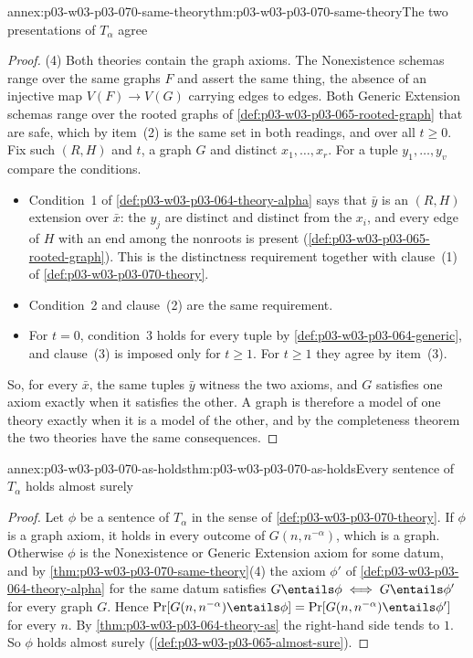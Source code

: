 \begin{annexitem}{annex:p03-w03-p03-070-same-theory}{thm:p03-w03-p03-070-same-theory}{The two presentations of \(T_\alpha\) agree}
\begin{proof}
(4) Both theories contain the graph axioms.  The Nonexistence schemas range
over the same graphs \(F\) and assert the same thing, the absence of an
injective map \(V(F)\to V(G)\) carrying edges to edges.  Both Generic
Extension schemas range over the rooted graphs of
\cref{def:p03-w03-p03-065-rooted-graph} that are safe, which by item~(2) is
the same set in both readings, and over all \(t\geq0\).  Fix such
\((R,H)\) and \(t\), a graph \(G\) and distinct \(x_1,\ldots,x_r\).  For a
tuple \(y_1,\ldots,y_v\) compare the conditions.
\begin{itemize}
\item Condition~1 of \cref{def:p03-w03-p03-064-theory-alpha} says that
      \(\bar y\) is an \((R,H)\) extension over \(\bar x\): the \(y_j\) are
      distinct and distinct from the \(x_i\), and every edge of \(H\) with an
      end among the nonroots is present
      (\cref{def:p03-w03-p03-065-rooted-graph}).  This is the distinctness
      requirement together with clause~(1) of
      \cref{def:p03-w03-p03-070-theory}.
\item Condition~2 and clause~(2) are the same requirement.
\item For \(t=0\), condition~3 holds for every tuple by
      \cref{def:p03-w03-p03-064-generic}, and clause~(3) is imposed only for
      \(t\geq1\).  For \(t\geq1\) they agree by item~(3).
\end{itemize}
So, for every \(\bar x\), the same tuples \(\bar y\) witness the two axioms,
and \(G\) satisfies one axiom exactly when it satisfies the other.  A graph is
therefore a model of one theory exactly when it is a model of the other, and
by the completeness theorem the two theories have the same consequences.
\end{proof}
\end{annexitem}

\begin{annexitem}{annex:p03-w03-p03-070-as-holds}{thm:p03-w03-p03-070-as-holds}{Every sentence of \(T_\alpha\) holds almost surely}
\begin{proof}
Let \(\phi\) be a sentence of \(T_\alpha\) in the sense of
\cref{def:p03-w03-p03-070-theory}.  If \(\phi\) is a graph axiom, it holds in
every outcome of \(G(n,n^{-\alpha})\), which is a graph.  Otherwise \(\phi\)
is the Nonexistence or Generic Extension axiom for some datum, and by
\cref{thm:p03-w03-p03-070-same-theory}(4) the axiom \(\phi'\) of
\cref{def:p03-w03-p03-064-theory-alpha} for the same datum satisfies
\(G\entails\phi\iff G\entails\phi'\) for every graph \(G\).  Hence
\(\Pr[G(n,n^{-\alpha})\entails\phi]=\Pr[G(n,n^{-\alpha})\entails\phi']\) for
every \(n\).  By \cref{thm:p03-w03-p03-064-theory-as} the right-hand side tends
to \(1\).  So \(\phi\) holds almost surely
(\cref{def:p03-w03-p03-065-almost-sure}).
\end{proof}
\end{annexitem}

